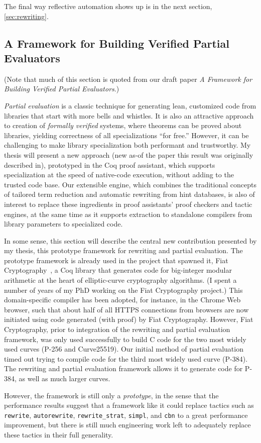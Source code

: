 \documentclass[twoside]{article}
\begin{document}
{The final way reflective automation shows up is in the next section, \autoref{sec:rewriting}.

\subsection{A Framework for Building Verified Partial Evaluators} \label{sec:rewriting}

(Note that much of this section is quoted from our draft paper \emph{A Framework for Building Verified Partial Evaluators}.)

\emph{Partial evaluation} is a classic technique for generating lean, customized code from libraries that start with more bells and whistles.
It is also an attractive approach to creation of \emph{formally verified} systems, where theorems can be proved about libraries, yielding correctness of all specializations ``for free.''
However, it can be challenging to make library specialization both performant and trustworthy.
My thesis will present a new approach (new as-of the paper this result was originally described in), prototyped in the Coq proof assistant, which supports specialization at the speed of native-code execution, without adding to the trusted code base.
Our extensible engine, which combines the traditional concepts of tailored term reduction and automatic rewriting from hint databases, is also of interest to replace these ingredients in proof assistants' proof checkers and tactic engines, at the same time as it supports extraction to standalone compilers from library parameters to specialized code.

In some sense, this section will describe the central new contribution presented by my thesis, this prototype framework for rewriting and partial evaluation.
The prototype framework is already used in the project that spawned it, Fiat Cryptography~\cite{FiatCryptoSP19}, a Coq library that generates code for big-integer modular arithmetic at the heart of elliptic-curve cryptography algorithms.
(I spent a number of years of my PhD working on the Fiat Cryptography project.)
This domain-specific compiler has been adopted, for instance, in the Chrome Web browser, such that about half of all HTTPS connections from browsers are now initiated using code generated (with proof) by Fiat Cryptography.
However, Fiat Cryptography, prior to integration of the rewriting and partial evaluation framework, was only used successfully to build C code for the two most widely used curves (P-256 and Curve25519).
Our initial method of partial evaluation timed out trying to compile code for the third most widely used curve (P-384).
The rewriting and partial evaluation framework allows it to generate code for P-384, as well as much larger curves.

However, the framework is still only a \emph{prototype}, in the sense that the performance results suggest that a framework like it could replace tactics such as \texttt{rewrite}, \texttt{autorewrite}, \texttt{rewrite\_strat}, \texttt{simpl}, and \texttt{cbn} to a great performance improvement, but there is still much engineering work left to adequately replace these tactics in their full generality.

%
\printbibliography[title=References]
}%
\end{document}
